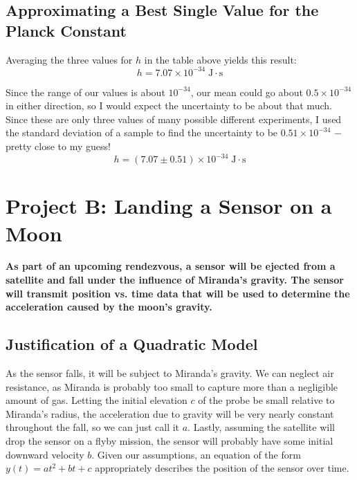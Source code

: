 \documentclass{article}
\begin{document}
\subsection{Approximating a Best Single Value for the Planck Constant}

Averaging the three values for $h$ in the table above yields this result:
\begin{equation}
h = 7.07 \times 10^{-34}\;\text{J}\cdot\text{s}
\end{equation}

Since the range of our values is about $10^{-34}$, our mean could go about $0.5\times 10^{-34}$ in either direction, so I would expect the uncertainty to be about that much. Since these are only three values of many possible different experiments, I used the standard deviation of a sample to find the uncertainty to be $0.51\times 10^{-34}$ $-$ pretty close to my guess!
\begin{equation}
h = (7.07 \pm 0.51)\times 10^{-34}\;\text{J}\cdot\text{s}
\end{equation}

\section{Project B: Landing a Sensor on a Moon}

\textbf{As part of an upcoming rendezvous, a sensor will be ejected from a satellite and fall under the influence of Miranda’s gravity. The sensor will transmit position vs. time data that will be used to determine the acceleration caused by the moon’s gravity.}

\subsection{Justification of a Quadratic Model}

As the sensor falls, it will be subject to Miranda's gravity. We can neglect air resistance, as Miranda is probably too small to capture more than a negligible amount of gas. Letting the initial elevation $c$ of the probe be small relative to Miranda's radius, the acceleration due to gravity will be very nearly constant throughout the fall, so we can just call it $a$. Lastly, assuming the satellite will drop the sensor on a flyby mission, the sensor will probably have some initial downward velocity $b$. Given our assumptions, an equation of the form $y(t) = at^2 + bt + c$ appropriately describes the position of the sensor over time.
\end{document}
